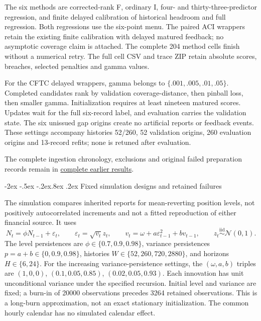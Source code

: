 \documentclass[12pt,a4paper]{article}
\makeatletter
\renewcommand\section{\@startsection{section}{1}{\z@}%
  {-2ex \@plus -.5ex \@minus -.2ex}{.8ex \@plus .2ex}%
  {\normalfont\large\bfseries}}
\makeatother
\begin{document}
The six methods are corrected-rank F, ordinary I, four- and thirty-three-predictor regression, and finite delayed calibration of historical headroom and full regression. Both regressions use the six-point menu. The paired ACI wrappers retain the existing finite calibration with delayed matured feedback; no asymptotic coverage claim is attached. The complete 204 method cells finish without a numerical retry. The full cell CSV and trace ZIP retain absolute scores, breaches, selected penalties and gamma values.

For the CFTC delayed wrappers, gamma belongs to $\{.001,.005,.01,.05\}$. Completed candidates rank by validation coverage-distance, then pinball loss, then smaller gamma. Initialization requires at least nineteen matured scores. Updates wait for the full six-record label, and evaluation carries the validation state. The six unissued gap origins create no artificial reports or feedback events. These settings accompany histories 52/260, 52 validation origins, 260 evaluation origins and 13-record refits; none is retuned after evaluation.

The complete ingestion chronology, exclusions and original failed preparation records remain in \href{https://github.com/ByronLi0207/financial-mathematics-paper-20261020/blob/submission-final/EXTENDED_RESULTS.md#asmbi-extended-s30}{complete earlier results}.

\FloatBarrier


\section{Fixed simulation designs and retained failures}\label{sup:simulation-original}\label{sup:simulation-primary}\label{sup:simulation-secondary}\label{sup:v8-mc}\label{sup:v9-legacy-mc}\label{sup:v9-stability}\label{sup:v10-menu}

The simulation compares inherited reports for mean-reverting position levels,
not positively autocorrelated increments and not a fitted reproduction of either
financial source. It uses
\[
N_t=\phi N_{t-1}+\varepsilon_t,\qquad
\varepsilon_t=\sqrt{v_t}z_t,\qquad
v_t=\omega+a\varepsilon_{t-1}^{2}+bv_{t-1},\qquad
z_t\stackrel{\mathrm{iid}}{\sim}\mathcal N(0,1).
\]
The level persistences are \(\phi\in\{0.7,0.9,0.98\}\), variance persistences
\(p=a+b\in\{0,0.9,0.98\}\), histories \(W\in\{52,260,720,2880\}\), and horizons
\(H\in\{6,24\}\). For the increasing variance-persistence settings, the
\((\omega,a,b)\) triples are \((1,0,0)\), \((0.1,0.05,0.85)\), \((0.02,0.05,0.93)\). Each innovation has unit unconditional
variance under the specified recursion. Initial level and variance are fixed;
a burn-in of 20000 observations precedes 3264 retained observations.
This is a long-burn approximation, not an exact stationary initialization.
The common hourly calendar has no simulated calendar effect.
\end{document}
